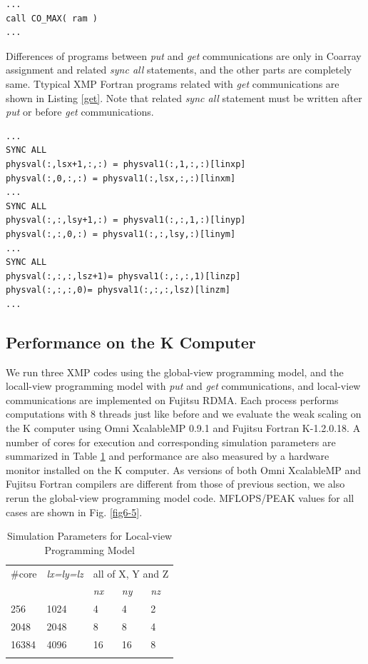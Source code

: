 \documentclass[graybox]{svmult}
\begin{document}
\begin{lstlisting}[caption=Reduction operations can be replaced by an intrinsic subroutine., label=comax]
...
call CO_MAX( ram ) 
...
\end{lstlisting}

Differences of programs between {\it put} and {\it get} communications are only in Coarray assignment and related {\it sync all} statements, and the other parts are completely same. Ttypical XMP Fortran programs related with {\it get} communications are shown in Listing \ref{get}. Note that related {\it sync all} statement must be written after {\it put} or before {\it get} communications.

\begin{lstlisting}[caption=Typical XMP programs using the local-view programming model with {\it get} communications for all of X{,} Y and Z domain decomposition method., label=get]
...
SYNC ALL
physval(:,lsx+1,:,:) = physval1(:,1,:,:)[linxp]
physval(:,0,:,:) = physval1(:,lsx,:,:)[linxm]
...
SYNC ALL
physval(:,:,lsy+1,:) = physval1(:,:,1,:)[linyp]
physval(:,:,0,:) = physval1(:,:,lsy,:)[linym]
...
SYNC ALL
physval(:,:,:,lsz+1)= physval1(:,:,:,1)[linzp] 
physval(:,:,:,0)= physval1(:,:,:,lsz)[linzm] 
...
\end{lstlisting}

\subsection{Performance on the K Computer}
We run three XMP codes using the global-view programming model, and the locall-view programming model with {\it put} and {\it get} communications, and local-view communications are implemented on Fujitsu RDMA. Each process performs computations with 8 threads just like before and we evaluate the weak scaling on the K computer using Omni XcalableMP 0.9.1 and Fujitsu Fortran K-1.2.0.18.
A number of cores for execution and corresponding simulation parameters are summarized in Table \ref{tab6-2} and performance are also measured by a hardware monitor installed on the K computer. As versions of both Omni XcalableMP and Fujitsu Fortran compilers are different from those of previous section, we also rerun the global-view programming model code. MFLOPS/PEAK values for all cases are shown in Fig. \ref{fig6-5}.

\begin{table}[h]
\caption{Simulation Parameters for Local-view Programming Model}
\label{tab6-2}
\begin{tabular}{p{2cm}p{2cm}p{1.5cm}p{1.5cm}p{1.5cm}}
\hline\noalign{\smallskip}
\#core & {\it lx=ly=lz} & \multicolumn{3}{l}{all of X, Y and Z} \\
\cline{3-5}
 & & {\it nx} & {\it ny} & {\it nz} \\
\noalign{\smallskip}\svhline\noalign{\smallskip}
256 & 1024 & 4 & 4 & 2 \\
2048 & 2048 & 8 & 8 & 4 \\
16384 & 4096 & 16 & 16 & 8 \\
\noalign{\smallskip}\hline\noalign{\smallskip}
\end{tabular}
\end{table}
\end{document}
